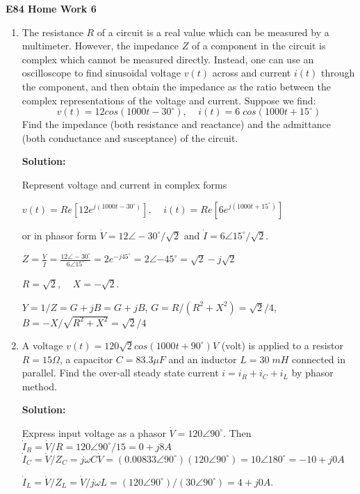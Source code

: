 \usepackage{html}

\begin{center}
{\Large \bf E84 Home Work 6}
\end{center}

\begin{enumerate}


\item The resistance $R$ of a circuit is a real value which can be measured
by a multimeter. However, the impedance $Z$ of a component in the circuit is 
complex which cannot be measured directly. Instead, one can use an oscilloscope 
to find sinusoidal voltage $v(t)$ across and current $i(t)$ through the component,
and then obtain the impedance as the ratio between the complex representations of 
the voltage and current. Suppose we find:
\[ v(t)=12 cos(1000t-30^\circ),\;\;\;\; i(t)=6\;cos(1000t+15^\circ) \]
Find the impedance (both resistance and reactance) and the admittance (both
conductance and susceptance) of the circuit.

{\bf Solution:}

Represent voltage and current in complex forms

$v(t)=Re[12e^{j(1000 t-30^\circ)}],\;\;\;\;i(t)=Re[6e^{j(1000 t+15^\circ)}]$

or in phasor form $\dot{V}=12 \angle -30^\circ/\sqrt{2}$ and 
$\dot{I}=6 \angle 15^\circ/\sqrt{2}$.

$Z=\frac{\dot{V}}{\dot{I}}=\frac{12\angle -30^\circ}{6\angle 15^\circ}
=2e^{-j45^\circ}=2\angle{-45^\circ}=\sqrt{2}-j\sqrt{2}$

$R=\sqrt{2},\;\;\;\;X=-\sqrt{2}$.

$Y=1/Z=G+jB=G+jB$, $G=R/(R^2+X^2)=\sqrt{2}/4$, $B=-X/\sqrt{R^2+X^2}=\sqrt{2}/4$

\item A voltage $v(t)=120\sqrt{2} cos(1000t+90^\circ) V$ (volt) is applied to 
a resistor $R=15\Omega$, a capacitor $C=83.3\mu F$ and an inductor $L=30\; mH$ 
connected in parallel. Find the over-all steady state current $i=i_R+i_C+i_L$ 
by phasor method.

{\bf Solution:}

Express input voltage as a phasor $\dot{V}=120\angle{90^\circ}$.  
Then $\dot{I}_R=\dot{V}/R=120\angle{90^\circ}/15=0+j8 A$
 $\dot{I}_C=\dot{V}/Z_C=j\omega C\dot{V}=(0.00833\angle 90^\circ)(120\angle{90^\circ})
 	=10\angle 180^\circ=-10+j0 A$

$\dot{I}_L=\dot{V}/Z_L=\dot{V}/j\omega L=(120\angle 90^\circ)/(30\angle{90^\circ})=4+j0 A$.


\end{enumerate}
